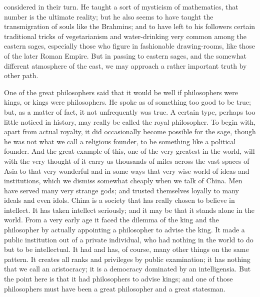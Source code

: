 considered in their turn. He taught a sort of mysticism of mathematics, that number is the ultimate reality; but he also seems to have taught the transmigration of souls like the Brahmins; and to have left to his followers certain traditional tricks of vegetarianism and water-drinking very common among the eastern sages, especially those who figure in fashionable drawing-rooms, like those of the later Roman Empire. But in passing to eastern sages, and the somewhat different atmosphere of the east, we may approach a rather important truth by other path.

One of the great philosophers said that it would be well if philosophers were kings, or kings were philosophers. He spoke as of something too good to be true; but, as a matter of fact, it not unfrequently was true. A certain type, perhaps too little noticed in history, may really be called the royal philosopher. To begin with, apart from actual royalty, it did occasionally become possible for the sage, though he was not what we call a religious founder, to be something like a political founder. And the great example of this, one of the very greatest in the world, will with the very thought of it carry us thousands of miles across the vast spaces of Asia to that very wonderful and in some ways that very wise world of ideas and institutions, which we dismiss somewhat cheaply when we talk of China. Men have served many very strange gods; and trusted themselves loyally to many ideals and even idols. China is a society that has really chosen to believe in intellect. It has taken intellect seriously; and it may be that it stands alone in the world. From a very early age it faced the dilemma of the king and the philosopher by actually appointing a philosopher to advise the king. It made a public institution out of a private individual, who had nothing in the world to do but to be intellectual. It had and has, of course, many other things on the same pattern. It creates all ranks and privileges by public examination; it has nothing that we call an aristocracy; it is a democracy dominated by an intelligensia. But the point here is that it had philosophers to advise kings; and one of those philosophers must have been a great philosopher and a great statesman.

